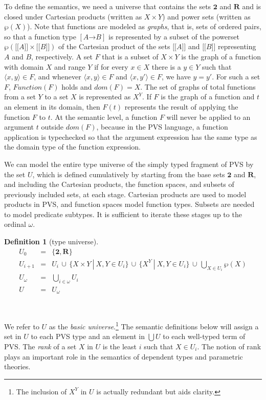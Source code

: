 \documentclass [12pt,twoside]{cslreport}
\newcommand{\thmbox}
   {{\ \hfill\hbox{%
      \vrule width1.0ex height1.0ex
   }\parfillskip 0pt }}
\newcommand{\aro}{\mathord\rightarrow} %
\newcommand{\mean}[1]{\lbrack\!\lbrack #1 \rbrack\!\rbrack}
\newcommand{\pair}[1]{\langle #1 \rangle}
\newcommand{\union}{\cup}
\newcommand{\funtype}[2]{[#1 \aro #2]}
\newcommand{\twob}{\mathbf{2}}
\newcommand{\reals}{\mathbf{R}}
\newcommand{\vbar}{\ |\ }
\newtheorem{definition}{Definition}
\newenvironment{Defn}[1]{\begin{definition}[#1]\label{defn:#1}}{
\thmbox\end{definition}}
\begin{document}
To define the semantics, we need a universe that contains the sets
$\twob$ and 
$\reals$
and is closed under Cartesian products (written as $X\times Y$)
and power sets (written as $\wp(X)$)\@.  Note that
functions are modeled as \emph{graphs}, that is, sets of ordered pairs,
so that a function type $\funtype{A}{B}$ is represented by a subset of
the powerset $\wp(\mean{A}\times \mean{B})$
of the Cartesian product of the sets $\mean{A}$ and $\mean{B}$
representing $A$ and 
$B$, respectively\@.  A set $F$ that is a subset of $X \times Y$ is the graph of a
function with domain $X$ and range $Y$ if for every $x\in X$ there is a $y\in
Y$ such that $\pair{x, y}\in F$, and whenever $\pair{x, y}\in F$
and $\pair{x, y'}\in F$, we have $y = y'$\@.  For such a set $F$,
$ \textit{Function}(F)$ holds and $ \textit{dom}(F) = X$\@.  
The set of graphs of total functions from a set $Y$ to a set $X$
is represented as $X^Y$\@.   If $F$ is the graph of a function and $t$ an
element in its domain, then
$F(t)$ represents the result of applying the function $F$ to $t$\@.
At the semantic level,  a function $F$ will never be applied to an argument
$t$ outside $\textit{dom}(F)$, because in the PVS language,
a function application is typechecked so that the
argument expression has the same type as the domain type of the
function expression.  

We can model the entire type universe of the simply typed fragment of PVS
by the set $U$, which is defined cumulatively by starting from the base
sets $\twob$ and $\reals$, and including the Cartesian products, the
function spaces, and subsets of previously included sets, at each stage.
Cartesian products are used to model products in PVS, and function spaces
model function types.  Subsets are needed to model predicate subtypes.
It is sufficient to iterate these stages up to the ordinal $\omega$\@.
\begin{Defn}{type universe}
\begin{eqnarray*}
  U_0 & = & \{ {\twob}, {\reals}  \} \\
  U_{i+1} & = & U_i \,\union\, \{X\times Y \vbar X, Y \in U_i\} \,\union\,
                           \{X^Y \vbar X, Y \in U_i \} \,\union\,
                           \bigcup_{X\in U_i}\wp(X)\\
  U_{\omega} & = & \bigcup_{i\in\omega} U_i\\
  U & = & U_{\omega}
\end{eqnarray*}
\end{Defn}


We refer to $U$ as the \emph{basic universe}.\footnote{The inclusion of $X^Y$ in $U$ is actually redundant but aids clarity.}   The semantic definitions
below will assign a set in $U$ to each PVS type and an element
in $\bigcup U$ to each well-typed term of PVS.  The \emph{rank} of a set
$X$ in $U$ is the least $i$ such that $X\in U_i$\@.  The notion of rank
plays an important role in the semantics of dependent types and
parametric theories.
\end{document}
